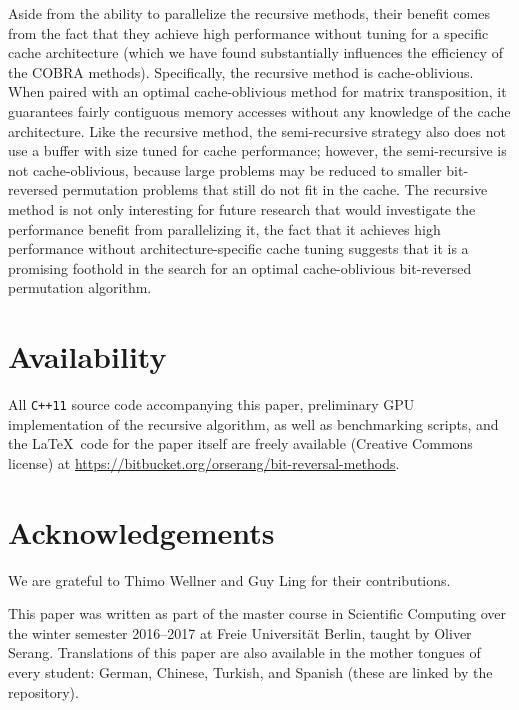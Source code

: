 \documentclass[10pt]{article}
\begin{document}
Aside from the ability to parallelize the recursive methods, their
benefit comes from the fact that they achieve high performance without
tuning for a specific cache architecture (which we have found
substantially influences the efficiency of the COBRA
methods). Specifically, the recursive method is cache-oblivious. When
paired with an optimal cache-oblivious method for matrix
transposition\cite{prokop:cache}, it guarantees fairly contiguous
memory accesses without any knowledge of the cache architecture. Like
the recursive method, the semi-recursive strategy also does not use a
buffer with size tuned for cache performance; however, the
semi-recursive is not cache-oblivious, because large problems may be
reduced to smaller bit-reversed permutation problems that still do not
fit in the cache. The recursive method is not only interesting for
future research that would investigate the performance benefit from
parallelizing it, the fact that it achieves high performance without
architecture-specific cache tuning suggests that it is a promising
foothold in the search for an optimal cache-oblivious bit-reversed
permutation algorithm.

\section*{Availability}
All {\tt C++11} source code accompanying this paper, preliminary GPU
implementation of the recursive algorithm, as well as benchmarking
scripts, and the \LaTeX\ code for the paper itself are freely
available (Creative Commons license) at
\url{https://bitbucket.org/orserang/bit-reversal-methods}.\newline

\section*{Acknowledgements}

We are grateful to Thimo Wellner and Guy Ling for their
contributions.\newline 

\noindent This paper was written as part of the master course in
Scientific Computing over the winter semester 2016--2017 at Freie
Universit\"at Berlin, taught by Oliver Serang. Translations of this
paper are also available in the mother tongues of every student:
German, Chinese, Turkish, and Spanish (these are linked by the
repository). %
\end{document}
